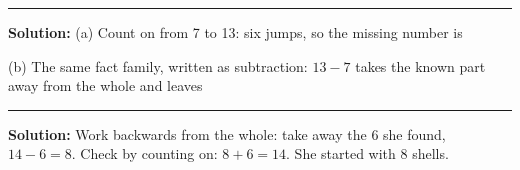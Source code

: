 \documentclass[12pt]{article}
\begin{document}
\vspace{0.3cm}\noindent\rule{\linewidth}{0.2pt}\vspace{0.1cm}


\textbf{Solution:} (a) Count on from 7 to 13: six jumps, so the missing
number is 

(b) The same fact family, written as subtraction: $13 - 7$ takes the known
part away from the whole and leaves 

\vspace{0.3cm}\noindent\rule{\linewidth}{0.2pt}\vspace{0.1cm}


\textbf{Solution:} Work backwards from the whole: take away the 6 she found,
$14 - 6 = 8$. Check by counting on: $8 + 6 = 14$. She started with 8 shells.
\end{document}
